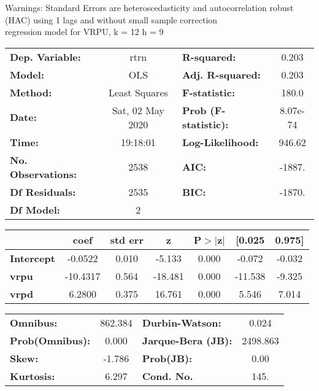 Warnings: \newline
 [1] Standard Errors are heteroscedasticity and autocorrelation robust (HAC) using 1 lags and without small sample correction\\ 

regression model for VRPU, k = 12 h = 9\begin{center}
\begin{tabular}{lclc}
\toprule
\textbf{Dep. Variable:}    &       rtrn       & \textbf{  R-squared:         } &     0.203   \\
\textbf{Model:}            &       OLS        & \textbf{  Adj. R-squared:    } &     0.203   \\
\textbf{Method:}           &  Least Squares   & \textbf{  F-statistic:       } &     180.0   \\
\textbf{Date:}             & Sat, 02 May 2020 & \textbf{  Prob (F-statistic):} &  8.07e-74   \\
\textbf{Time:}             &     19:18:01     & \textbf{  Log-Likelihood:    } &    946.62   \\
\textbf{No. Observations:} &        2538      & \textbf{  AIC:               } &    -1887.   \\
\textbf{Df Residuals:}     &        2535      & \textbf{  BIC:               } &    -1870.   \\
\textbf{Df Model:}         &           2      & \textbf{                     } &             \\
\bottomrule
\end{tabular}
\begin{tabular}{lcccccc}
                   & \textbf{coef} & \textbf{std err} & \textbf{z} & \textbf{P$> |$z$|$} & \textbf{[0.025} & \textbf{0.975]}  \\
\midrule
\textbf{Intercept} &      -0.0522  &        0.010     &    -5.133  &         0.000        &       -0.072    &       -0.032     \\
\textbf{vrpu}      &     -10.4317  &        0.564     &   -18.481  &         0.000        &      -11.538    &       -9.325     \\
\textbf{vrpd}      &       6.2800  &        0.375     &    16.761  &         0.000        &        5.546    &        7.014     \\
\bottomrule
\end{tabular}
\begin{tabular}{lclc}
\textbf{Omnibus:}       & 862.384 & \textbf{  Durbin-Watson:     } &    0.024  \\
\textbf{Prob(Omnibus):} &   0.000 & \textbf{  Jarque-Bera (JB):  } & 2498.863  \\
\textbf{Skew:}          &  -1.786 & \textbf{  Prob(JB):          } &     0.00  \\
\textbf{Kurtosis:}      &   6.297 & \textbf{  Cond. No.          } &     145.  \\
\bottomrule
\end{tabular}
\end{center}

